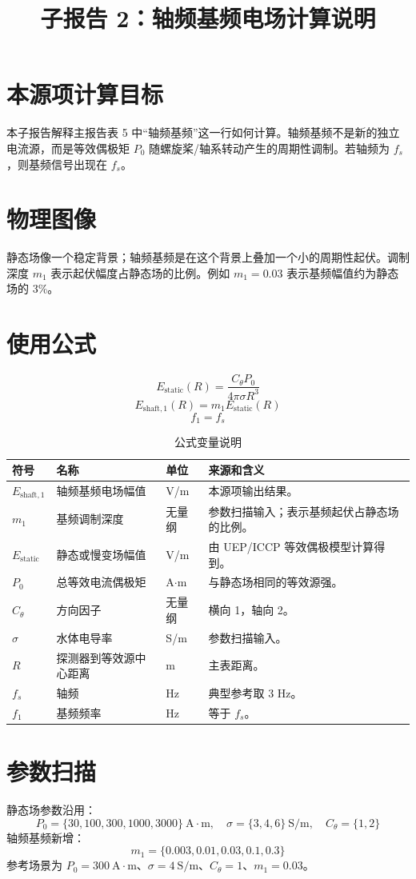 \documentclass[UTF8,a4paper,11pt]{ctexart}
\title{子报告 2：轴频基频电场计算说明}
\author{}
\date{}
\begin{document}
\maketitle

\section{本源项计算目标}
本子报告解释主报告表 5 中“轴频基频”这一行如何计算。轴频基频不是新的独立电流源，而是等效偶极矩 $P_0$ 随螺旋桨/轴系转动产生的周期性调制。若轴频为 $f_s$，则基频信号出现在 $f_s$。

\section{物理图像}
静态场像一个稳定背景；轴频基频是在这个背景上叠加一个小的周期性起伏。调制深度 $m_1$ 表示起伏幅度占静态场的比例。例如 $m_1=0.03$ 表示基频幅值约为静态场的 3\%。

\section{使用公式}
\[
E_{\mathrm{static}}(R)=\frac{C_\theta P_0}{4\pi\sigma R^3}
\]
\[
E_{\mathrm{shaft},1}(R)=m_1E_{\mathrm{static}}(R)
\]
\[
f_1=f_s
\]

\begin{longtable}{p{2.7cm}p{3.3cm}p{2.0cm}p{5.4cm}}
\caption{公式变量说明}\\
\toprule
符号 & 名称 & 单位 & 来源和含义\\
\midrule
$E_{\mathrm{shaft},1}$ & 轴频基频电场幅值 & V/m & 本源项输出结果。\\
$m_1$ & 基频调制深度 & 无量纲 & 参数扫描输入；表示基频起伏占静态场的比例。\\
$E_{\mathrm{static}}$ & 静态或慢变场幅值 & V/m & 由 UEP/ICCP 等效偶极模型计算得到。\\
$P_0$ & 总等效电流偶极矩 & A$\cdot$m & 与静态场相同的等效源强。\\
$C_\theta$ & 方向因子 & 无量纲 & 横向 1，轴向 2。\\
$\sigma$ & 水体电导率 & S/m & 参数扫描输入。\\
$R$ & 探测器到等效源中心距离 & m & 主表距离。\\
$f_s$ & 轴频 & Hz & 典型参考取 3 Hz。\\
$f_1$ & 基频频率 & Hz & 等于 $f_s$。\\
\bottomrule
\end{longtable}

\section{参数扫描}
静态场参数沿用：
\[
P_0=\{30,100,300,1000,3000\}\ \mathrm{A\cdot m},\quad
\sigma=\{3,4,6\}\ \mathrm{S/m},\quad
C_\theta=\{1,2\}
\]
轴频基频新增：
\[
m_1=\{0.003,0.01,0.03,0.1,0.3\}
\]
参考场景为 $P_0=300\ \mathrm{A\cdot m}$、$\sigma=4\ \mathrm{S/m}$、$C_\theta=1$、$m_1=0.03$。
\end{document}
